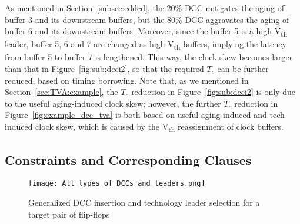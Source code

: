 As mentioned in Section~\ref{subsec:eddcd}, the 20\% DCC mitigates the aging of buffer 3 and its downstream buffers, but the 80\% DCC aggravates the aging of buffer 6 and its downstream buffers. Moreover, since the buffer 5 is a high-V\textsubscript{th} leader, buffer 5, 6 and 7 are changed as high-V\textsubscript{th} buffers, implying the latency from buffer 5 to buffer 7 is lengthened. This way, the clock skew becomes larger than that in Figure~\ref{fig:sub:dcci2}, so that the required $T_c$ can be further reduced, based on timing borrowing. Note that, as we mentioned in Section~\ref{sec:TVA:example}, the $T_c$ reduction in Figure~\ref{fig:sub:dcci2} is only due to the useful aging-induced clock skew; however, the  further $T_c$ reduction in Figure~\ref{fig:example_dcc_tva} is both based on useful aging-induced and tech-induced clock skew, which is caused by the V\textsubscript{th} reassignment of clock buffers. 

\subsection{Constraints and Corresponding Clauses}
\label{sec:TVA:leaderconstraint}
\begin{figure}
    \centering
    \texttt{[image: All\_types\_of\_DCCs\_and\_leaders.png]}
    \caption{Generalized DCC insertion and technology leader selection for a target pair of flip-flops}
    \label{fig:g_dcc_leader}
\end{figure}

